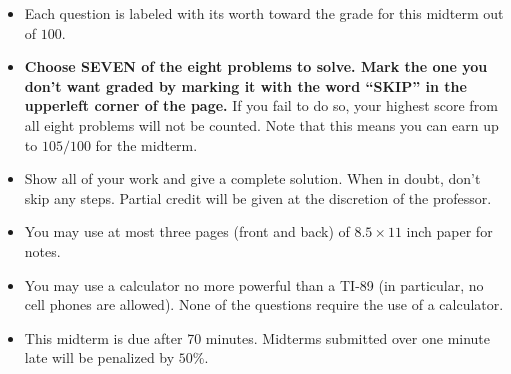\documentclass[12pt]{exam}
\newcommand{\<}{(}
\renewcommand{\>}{)}
\begin{document}
\begin{center}
\end{center}
\vspace{0.1in}

\vspace{12pt}

\begin{itemize}
  \item Each question is labeled with its worth toward the grade for
        this midterm out of \(100\).
  \item \textbf{Choose SEVEN of the eight problems to solve. Mark the
        one you don't want graded by marking it with the word ``SKIP''
        in the upperleft corner of the page.} If you fail to do so,
        your highest score from all eight problems will not be counted.
        Note that this means you can earn up to \(105/100\) for the midterm.
  \item Show all of your work and give a
        complete solution. When in doubt, don't skip any steps. Partial
        credit will be given at the discretion of the professor.
  \item You may use at most three pages (front and back)
        of \(8.5\times11\) inch paper for notes.
  \item You may use a calculator no more powerful than a TI-89 (in particular,
        no cell phones are allowed). None of the questions require the
        use of a calculator.
  \item This midterm is due after 70 minutes. Midterms submitted over one minute
        late will be penalized by \(50\%\).
\end{itemize}

\newpage
\end{document}
